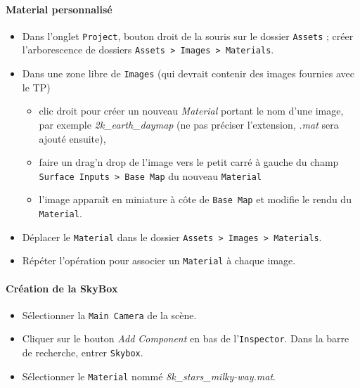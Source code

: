 \documentclass[a4paper,10pt]{article}
\newenvironment{solution}%
{\begin{tcolorbox}[breakable,colback=red!5!white,colframe=red!75!black,title=Solution]}%
{\end{tcolorbox}}
\begin{document}
\begin{solution}
\paragraph{Material personnalisé}

\begin{itemize}
	\item Dans l'onglet \texttt{Project}, bouton droit de la souris sur le dossier \texttt{Assets} ; créer l'arborescence de dossiers \texttt{Assets > Images > Materials}.
	\item Dans une zone libre de \texttt{Images} (qui devrait contenir des images fournies avec le TP)
	\begin{itemize}
		\item clic droit pour créer un nouveau \textit{Material} portant le nom d'une image, par exemple \textit{2k\_earth\_daymap} (ne pas préciser l'extension, \textit{.mat} sera ajouté ensuite),
		\item faire un drag'n drop de l'image vers le petit carré à gauche du champ \texttt{Surface Inputs > Base Map} du nouveau \texttt{Material}
		\item[$\rightarrow$] l'image apparaît en miniature à côte de \texttt{Base Map} et modifie le rendu du \texttt{Material}. 	
	\end{itemize}
	\item Déplacer le \texttt{Material} dans le dossier \texttt{Assets > Images > Materials}.
	\item Répéter l'opération pour associer un \texttt{Material} à chaque image.
\end{itemize}

\paragraph{Création de la SkyBox}

\begin{itemize}
	
	\item Sélectionner la \texttt{Main Camera} de la scène.
	
\item Cliquer sur le bouton \textit{Add Component} en bas de l'\texttt{Inspector}. Dans la barre de recherche, entrer \texttt{Skybox}.



	\item Sélectionner le \texttt{Material} nommé	\textit{8k\_stars\_milky-way.mat}.
	

\end{itemize}
\end{solution}
\end{document}
